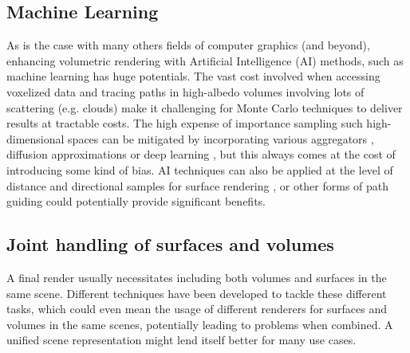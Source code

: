 \subsection{Machine Learning}
As is the case with many others fields of computer graphics (and beyond), enhancing volumetric rendering with Artificial Intelligence (AI) methods, such as machine learning has huge potentials. The vast cost involved when accessing voxelized data and tracing paths in high-albedo volumes involving lots of scattering (e.g. clouds) make it challenging for Monte Carlo techniques to deliver results at tractable costs. The high expense of importance sampling such high-dimensional spaces can be mitigated by incorporating various aggregators \cite{AIaggr01}\cite{AIaggr02}\cite{AIaggr03}, diffusion approximations \cite{AIdiff01}\cite{AIdiff02}\cite{AIdiff03}\cite{AIdiff04} or deep learning \cite{AIdl}, but this always comes at the cost of introducing some kind of bias.
AI techniques can also be applied at the level of distance and directional samples for surface rendering \cite{AIsurf01}\cite{AIsurf02}\cite{AIsurf03}\cite{AIsurf04}, or other forms of path guiding could potentially provide significant benefits.

\subsection{Joint handling of surfaces and volumes}
A final render usually necessitates including both volumes and surfaces in the same scene. Different techniques have been developed to tackle these different tasks, which could even mean the usage of different renderers for surfaces and volumes in the same scenes, potentially leading to problems when combined. A unified scene representation might lend itself better for many use cases.

